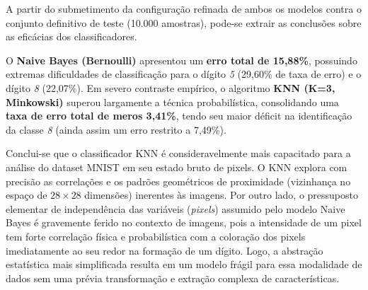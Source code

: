 \documentclass[12pt, a4paper]{article}
\begin{document}
A partir do submetimento da configuração refinada de ambos os modelos contra o conjunto definitivo de teste (10.000 amostras), pode-se extrair as conclusões sobre as eficácias dos classificadores. 

O \textbf{Naive Bayes (Bernoulli)} apresentou um \textbf{erro total de 15,88\%}, possuindo extremas dificuldades de classificação para o dígito \textit{5} (29,60\% de taxa de erro) e o dígito \textit{8} (22,07\%). Em severo contraste empírico, o algoritmo \textbf{KNN (K=3, Minkowski)} superou largamente a técnica probabilística, consolidando uma \textbf{taxa de erro total de meros 3,41\%}, tendo seu maior déficit na identificação da classe \textit{8} (ainda assim um erro restrito a 7,49\%).

Conclui-se que o classificador KNN é consideravelmente mais capacitado para a análise do dataset MNIST em seu estado bruto de pixels. O KNN explora com precisão as correlações e os padrões geométricos de proximidade (vizinhança no espaço de $28 \times 28$ dimensões) inerentes às imagens. Por outro lado, o pressuposto elementar de independência das variáveis (\textit{pixels}) assumido pelo modelo Naive Bayes é gravemente ferido no contexto de imagens, pois a intensidade de um pixel tem forte correlação física e probabilística com a coloração dos pixels imediatamente ao seu redor na formação de um dígito. Logo, a abstração estatística mais simplificada resulta em um modelo frágil para essa modalidade de dados sem uma prévia transformação e extração complexa de características.
\end{document}

